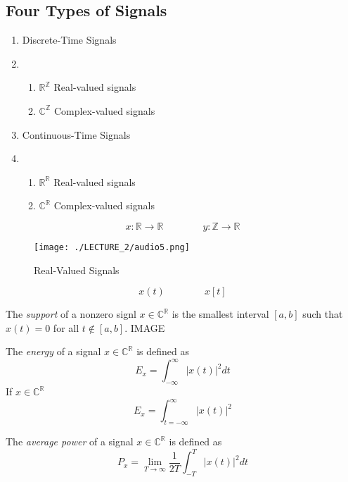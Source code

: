 \subsection*{Four Types of Signals}
\begin{enumerate}
    \item Discrete-Time Signals
    \item \begin{enumerate}
              \item $\mathbb{R}^{\mathbb{Z}}$ Real-valued signals
              \item $\mathbb{C}^{\mathbb{Z}}$ Complex-valued signals
          \end{enumerate}
    \item Continuous-Time Signals
    \item \begin{enumerate}
              \item $\mathbb{R}^{\mathbb{R}}$ Real-valued signals
              \item $\mathbb{C}^{\mathbb{R}}$ Complex-valued signals
          \end{enumerate}
\end{enumerate}

\begin{example}
    \[x : \mathbb{R} \to \mathbb{R} \qquad\qquad y : \mathbb{Z} \to \mathbb{R}\]
    \begin{figure}
        \texttt{[image: ./LECTURE\_2/audio5.png]}
        \caption{Real-Valued Signals}
    \end{figure}
    \[x(t) \qquad \qquad x[t]\]
\end{example}
\begin{definition}
    [Support]
    The \textit{support} of a nonzero signl $x \in \mathbb{C}^\mathbb{R}$ is the smallest interval $[a,b]$ such that $x(t) = 0$ for all $t \notin [a,b]$.
    IMAGE
\end{definition}

\begin{definition}
    [Energy]
    The \textit{energy} of a signal $x \in \mathbb{C}^\mathbb{R}$ is defined as
    \[
        E_x = \int_{-\infty}^{\infty} |x(t)|^2 dt
    \]
    If $x \in \mathbb{C}^\mathbb{R}$
    \[
        E_x = \int_{t=-\infty}^{\infty} |x(t)|^2
    \]
\end{definition}

\begin{definition}
    The \textit{average power} of a signal $x \in \mathbb{C}^\mathbb{R}$ is defined as
    \[
        P_x = \lim_{T \to \infty} \frac{1}{2T} \int_{-T}^{T} |x(t)|^2 dt
    \]
\end{definition}


